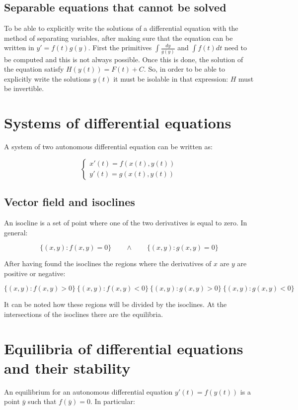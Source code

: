 	\subsection{Separable equations that cannot be solved}
	To be able to explicitly write the solutions of a differential equation with the method of separating variables, after making sure that the equation can be written in $y' = f(t)g(y)$.
	First the primitives $\int\frac{dy}{g(y)}$ and $\int f(t)dt$ need to be computed and this is not always possible.
	Once this is done, the solution of the equation satisfy $H(y(t)) = F(t)+C$.
	So, in order to be able to explicitly write the solutions $y(t)$ it must be isolable in that expression: $H$ must be invertible.

\section{Systems of differential equations}
A system of two autonomous differential equation can be written as:

$$\begin{cases}x'(t) = f(x(t), y(t))\\y'(t)=g(x(t), y(t))\end{cases}$$

	\subsection{Vector field and isoclines}
	An isocline is a set of point where one of the two derivatives is equal to zero.
	In general:

	$$\{(x,y):f(x,y) = 0\}\qquad\land\qquad\{(x,y):g(x,y) = 0\}$$

	After having found the isoclines the regions where the derivatives  of $x$ are $y$ are positive or negative:

	$$\{(x,y):f(x,y)>0\}\ \{(x,y):f(x,y)<0\}\ \{(x,y):g(x,y)>0\}\ \{(x,y):g(x,y)<0\}$$

	It can be noted how these regions will be divided by the isoclines.
	At the intersections of the isoclines there are the equilibria.

\section{Equilibria of differential equations and their stability}
An equilibrium for an autonomous differential equation $y'(t) = f(y(t))$ is a point $\bar{y}$ such that $f(\bar{y}) = 0$.
In particular:

